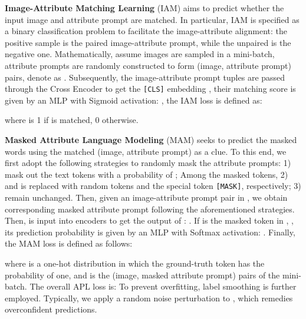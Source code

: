 \documentclass[sigconf]{acmart}
\begin{document}
\noindent\textbf{Image-Attribute Matching Learning}
(IAM) aims to predict whether the input image and attribute prompt are matched. 
In particular, IAM is specified as a binary classification problem to facilitate the image-attribute alignment: the positive sample is the paired image-attribute prompt, while the unpaired is the negative one.
Mathematically, assume  images are sampled in a mini-batch,  attribute prompts are randomly constructed to form  (image, attribute prompt) pairs, denote as .
Subsequently, the image-attribute prompt tuples are passed through the Cross Encoder to get the \texttt{[CLS]} embedding , their matching score is given by an MLP with Sigmoid activation: ,
the IAM loss is defined as: 
\vspace{-.1in}

where  is 1 if  is matched, 0  otherwise.


\noindent\textbf{Masked Attribute Language Modeling}
(MAM) seeks to predict the masked words using the matched (image, attribute prompt) as a clue.
To this end, we first adopt the following strategies to randomly mask the  attribute prompts:
1) mask out the text tokens with a probability of ; 
Among the masked tokens, 2)  and  is replaced with random tokens and the special token \texttt{[MASK]}, respectively; 
3)  remain unchanged.
Then, given an image-attribute prompt pair  in , we obtain corresponding masked attribute prompt  following the aforementioned strategies.
Then,  is input into encoders to get the output of : .
If  is the masked token in , , its prediction probability is given by an MLP with Softmax activation: . Finally, the MAM loss is defined as follows:
\vspace{-.1in}

where  is a one-hot distribution in which the ground-truth
token  has the probability of one, and  is the  (image, masked attribute prompt) pairs of the mini-batch.
The overall APL loss is: 
To prevent overfitting, label smoothing is further employed. Typically, we apply a random noise perturbation to , which remedies overconfident predictions.
\end{document}
